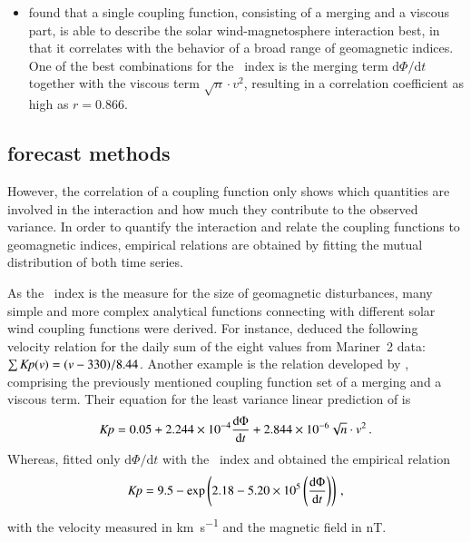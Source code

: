 \begin{itemize}
	\item \citet{Newell2008} found that a single coupling function, consisting of a merging and a viscous part, is able to describe the solar wind-magnetosphere interaction best, in that it correlates with the behavior of a broad range of geomagnetic indices. One of the best combinations for the \Kp~index is the merging term $\text{d}\Phi / \text{d}t$ together with the viscous term $\sqrt{n} \cdot v^2$, resulting in a correlation coefficient as high as $r = 0.866$.
	
\end{itemize}


\subsection{\Kp{} forecast methods}
However, the correlation of a coupling function only shows which quantities are involved in the interaction and how much they contribute to the observed variance. In order to quantify the interaction and relate the coupling functions to geomagnetic indices, empirical relations are obtained by fitting the mutual distribution of both time series.

As the \Kp~index is the measure for the size of geomagnetic disturbances, many simple and more complex analytical functions connecting \Kp{} with different solar wind coupling functions were derived. For instance, \citet{Snyder1963} deduced the following velocity relation for the daily sum of the eight \Kp{} values from Mariner~2 data: $\sum \textit{Kp}(v) = (v - 330) / 8.44$. Another example is the relation developed by \citet{Newell2008}, comprising the previously mentioned coupling function set of a merging and a viscous term. Their equation for the least variance linear prediction of \Kp{} is
\begin{align}
	\textit{Kp}{} = 0.05 + \num{2.244e-4} \frac{\text{d}\Phi}{\text{d}t} + \num{2.844e-6} \sqrt{n} \cdot v^2	\,.
\end{align}
Whereas, \citet{Mays2015} fitted only $\text{d}\Phi / \text{d}t$ with the \Kp~index and obtained the empirical relation
\begin{align}
	\textit{Kp} = 9.5 - \exp\left(2.18 - \num{5.20e5} \left(\frac{\text{d}\Phi}{\text{d}t}\right)\right)	\,,
\end{align}
with the velocity measured in \si{\km\per\s} and the magnetic field in \si{\nano\tesla}.

